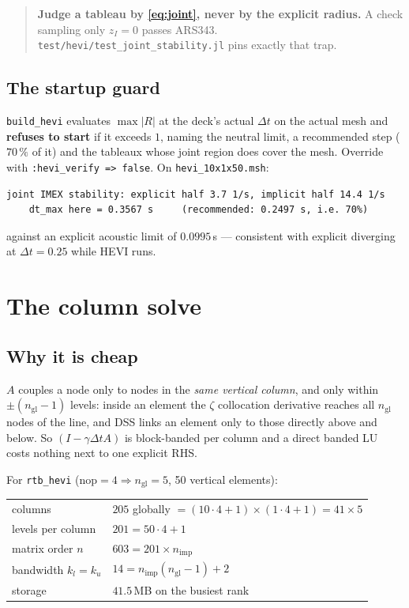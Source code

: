 \documentclass[11pt,a4paper]{article}
\begin{document}
\begin{quote}
\textbf{Judge a tableau by \eqref{eq:joint}, never by the explicit radius.}
A check sampling only $z_I=0$ passes ARS343.
\texttt{test/hevi/test\_joint\_stability.jl} pins exactly that trap.
\end{quote}

\subsection{The startup guard}
\texttt{build\_hevi} evaluates $\max|R|$ at the deck's actual $\Delta t$ on the
actual mesh and \textbf{refuses to start} if it exceeds $1$, naming the neutral
limit, a recommended step ($70\,\%$ of it) and the tableaux whose joint region
does cover the mesh. Override with \texttt{:hevi\_verify => false}. On
\texttt{hevi\_10x1x50.msh}:
\begin{lstlisting}
joint IMEX stability: explicit half 3.7 1/s, implicit half 14.4 1/s
    dt_max here = 0.3567 s     (recommended: 0.2497 s, i.e. 70%)
\end{lstlisting}
against an explicit acoustic limit of $0.0995$\,s --- consistent with explicit
diverging at $\Delta t=0.25$ while HEVI runs.

\section{The column solve}

\subsection{Why it is cheap}
$A$ couples a node only to nodes in the \emph{same vertical column}, and only
within $\pm(n_{\mathrm{gl}}-1)$ levels: inside an element the $\zeta$
collocation derivative reaches all $n_{\mathrm{gl}}$ nodes of the line, and DSS
links an element only to those directly above and below. So
$(I-\gamma\Delta t A)$ is block-banded per column and a direct banded LU costs
nothing next to one explicit RHS.

For \texttt{rtb\_hevi} ($\mathrm{nop}=4\Rightarrow n_{\mathrm{gl}}=5$, 50
vertical elements):
\begin{center}
\begin{tabular}{ll}
\toprule
columns & $205$ globally $=(10\cdot4+1)\times(1\cdot4+1)=41\times5$\\
levels per column & $201 = 50\cdot4+1$\\
matrix order $n$ & $603 = 201\times n_{\mathrm{imp}}$\\
bandwidth $k_l=k_u$ & $14 = n_{\mathrm{imp}}(n_{\mathrm{gl}}-1)+2$\\
storage & $41.5$\,MB on the busiest rank\\
\bottomrule
\end{tabular}
\end{center}
\end{document}
